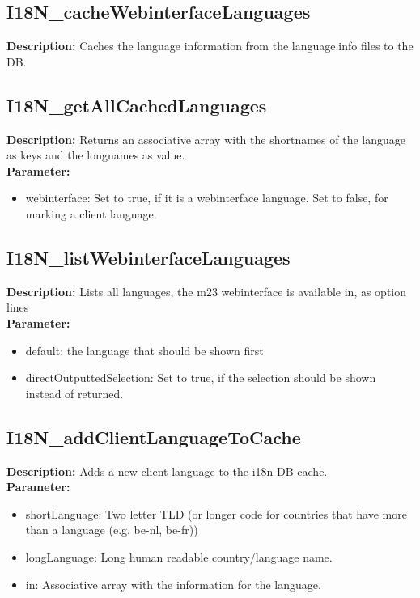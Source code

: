 \subsection{I18N\_cacheWebinterfaceLanguages}
\textbf{Description:} Caches the language information from the language.info files to the DB.\\

\subsection{I18N\_getAllCachedLanguages}
\textbf{Description:} Returns an associative array with the shortnames of the language as keys and the longnames as value.\\
\textbf{Parameter:}
\begin{itemize}
\item webinterface: Set to true, if it is a webinterface language. Set to false, for marking a client language.
\end{itemize}

\subsection{I18N\_listWebinterfaceLanguages}
\textbf{Description:} Lists all languages, the m23 webinterface is available in, as option lines\\
\textbf{Parameter:}
\begin{itemize}
\item default: the language that should be shown first
\item directOutputtedSelection: Set to true, if the selection should be shown instead of returned.
\end{itemize}

\subsection{I18N\_addClientLanguageToCache}
\textbf{Description:} Adds a new client language to the i18n DB cache.\\
\textbf{Parameter:}
\begin{itemize}
\item shortLanguage: Two letter TLD (or longer code for countries that have more than a language (e.g. be-nl, be-fr))
\item longLanguage: Long human readable country/language name.
\item in: Associative array with the information for the language.
\end{itemize}

